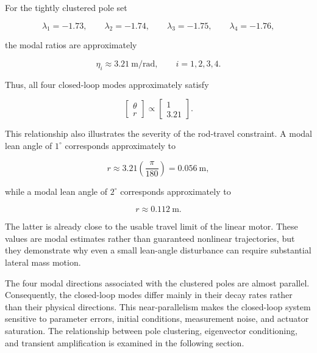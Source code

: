 For the tightly clustered pole set

\begin{equation}
\lambda_1=-1.73,
\qquad
\lambda_2=-1.74,
\qquad
\lambda_3=-1.75,
\qquad
\lambda_4=-1.76,
\label{eq:clustered-closed-loop-poles}
\end{equation}

the modal ratios are approximately

\begin{equation}
\eta_i
\approx
3.21~\mathrm{m/rad},
\qquad
i=1,2,3,4.
\label{eq:clustered-modal-ratios}
\end{equation}

Thus, all four closed-loop modes approximately satisfy

\begin{equation}
\begin{bmatrix}
\theta \\
r
\end{bmatrix}
\propto
\begin{bmatrix}
1 \\
3.21
\end{bmatrix}.
\label{eq:closed-loop-configuration-direction}
\end{equation}

This relationship also illustrates the severity of the rod-travel constraint. A modal lean angle of $1^\circ$ corresponds approximately to

\begin{equation}
r
\approx
3.21
\left(
\frac{\pi}{180}
\right)
=
0.056~\mathrm{m},
\end{equation}

while a modal lean angle of $2^\circ$ corresponds approximately to

\begin{equation}
r
\approx
0.112~\mathrm{m}.
\end{equation}

The latter is already close to the usable travel limit of the linear motor. These values are modal estimates rather than guaranteed nonlinear trajectories, but they demonstrate why even a small lean-angle disturbance can require substantial lateral mass motion.

The four modal directions associated with the clustered poles are almost parallel. Consequently, the closed-loop modes differ mainly in their decay rates rather than their physical directions. This near-parallelism makes the closed-loop system sensitive to parameter errors, initial conditions, measurement noise, and actuator saturation. The relationship between pole clustering, eigenvector conditioning, and transient amplification is examined in the following section.


